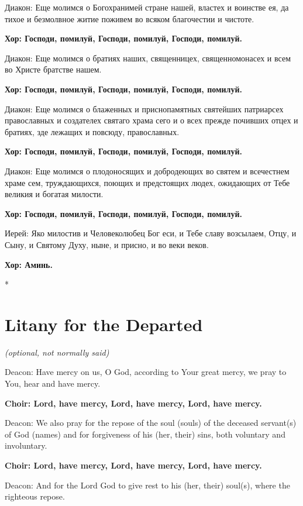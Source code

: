 \documentclass[12pt,a4paper,titlepage]{report}
\begin{document}
\begin{paracol}[1]{2}
  Диакон: Еще молимся о Богохранимей стране нашей, властех и воинстве ея, да тихое и безмолвное житие поживем во всяком благочестии и чистоте.

  \textbf{Хор: Господи, помилуй, Господи, помилуй, Господи, помилуй.}

  Диакон: Еще молимся о братиях наших, священницех, священномонасех и всем во Христе братстве нашем.

  \textbf{Хор: Господи, помилуй, Господи, помилуй, Господи, помилуй.}

  Диакон: Еще молимся о блаженных и приснопамятных святейших патриарсех православных и создателех святаго храма сего  и о всех прежде почивших отцех и братиях, зде лежащих и повсюду, православных.

  \textbf{Хор: Господи, помилуй, Господи, помилуй, Господи, помилуй.}

  Диакон: Еще молимся о плодоносящих и добродеющих во святем и всечестнем храме сем, труждающихся, поющих и предстоящих людех, ожидающих от Тебе великия и богатая милости.

  \textbf{Хор: Господи, помилуй, Господи, помилуй, Господи, помилуй.}

  Иерей: Яко милостив и Человеколюбец Бог еси, и Тебе славу возсылаем, Отцу, и Сыну, и Святому Духу, ныне, и присно, и во веки веков.

  \textbf{Хор: Аминь.}

  \switchcolumn[0]*

  \section*{Litany for the Departed}

  \indent \textit {(optional, not normally said)}

  Deacon: Have mercy on us, O God, according to Your great mercy, we pray to You, hear and have mercy.

  \textbf{Choir: Lord, have mercy, Lord, have mercy, Lord, have mercy.}

  Deacon: We also pray for the repose of the soul (souls) of the deceased servant(s) of God (names) and for forgiveness of his (her, their) sins, both voluntary and involuntary.

  \textbf{Choir: Lord, have mercy, Lord, have mercy, Lord, have mercy.}

  Deacon: And for the Lord God to give rest to his (her, their) soul(s), where the righteous repose.


\end{paracol}
\end{document}
